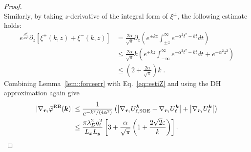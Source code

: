 \begin{proof}
\begin{equation}
	\end{equation}
	Similarly, by taking $z$-derivative of the integral form of $\xi^{\pm}$, the following estimate holds:
	\begin{equation}\label{eq::estiZ}
		\begin{split}
			e^{\frac{k^2}{4 \alpha^2}} \partial_z \left[\xi^{+} (k, z)+\xi^{-} (k, z)\right] & = \frac{2\alpha}{\sqrt{\pi}} \partial_z \left( e^{\pm k z} \int_{\pm z}^{\infty} e^{-\alpha^2 t^2 - kt} dt \right) \\
			& \leq \frac{2\alpha}{\sqrt{\pi}} k \left( e^{\pm k z} \int_{- \infty}^{\infty} e^{-\alpha^2 t^2 - kt} dt + e^{-\alpha^2 z^2} \right) \\
			& \leq \left(2 + \frac{2\alpha}{\sqrt{\pi}} \right) k\;.
		\end{split}
	\end{equation}
	Combining Lemma~\ref{lem::forceerr} with Eq.~\eqref{eq::estiZ} and using the DH approximation again give
	\begin{equation}
		\begin{split}
			\lvert \nabla_{\bm{r}_i}\widetilde{\varphi}^{\text{RB}}(\bm{k})\rvert&\leq \frac{1}{e^{-k^2/(4\alpha^2)}}\left(\left|\nabla_{\bm{r}_i}U_{\ell,\text{SOE}}^{\bm{k}}-\nabla_{\bm{r}_i}U_{\ell}^{\bm{k}}\right|+\left|\nabla_{\bm{r}_i}U_{\ell}^{\bm{k}}\right|\right)\\
			&\leq \frac{\pi \lambda_D^2 q_{i}^2}{L_xL_y}\left[3+\frac{\alpha}{\sqrt{\pi}}\left(1+\frac{2\sqrt{2}\varepsilon}{k}\right)\right].
		\end{split}
	\end{equation}
\end{proof}

